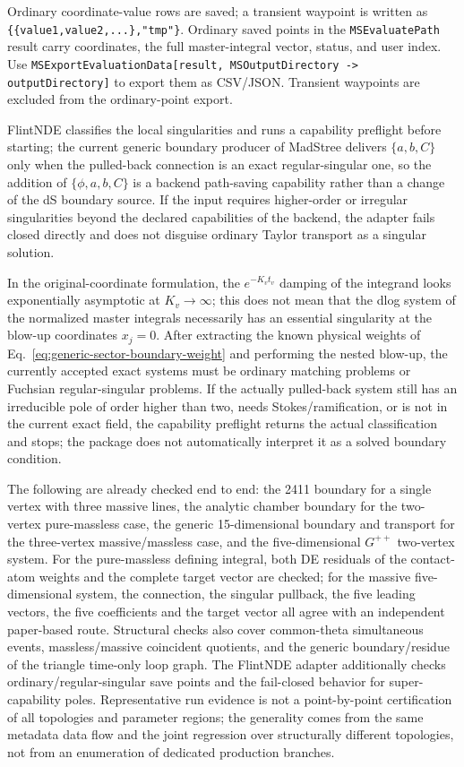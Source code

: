 \documentclass[11pt,a4paper]{article}
\begin{document}
Ordinary coordinate-value rows are saved; a transient waypoint is written as
\texttt{\{\{value1,value2,...\},"tmp"\}}. Ordinary saved points in the \texttt{MSEvaluatePath} result
carry coordinates, the full master-integral vector, status, and user index. Use
\texttt{MSExportEvaluationData[result, MSOutputDirectory -> outputDirectory]} to export
them as CSV/JSON. Transient waypoints are excluded from the ordinary-point export.

FlintNDE classifies the local singularities and runs a capability preflight before starting; the current generic boundary producer of MadStree delivers $\{a,b,C\}$ only when the pulled-back connection is an exact regular-singular one, so the addition of $\{\phi,a,b,C\}$ is a backend path-saving capability rather than a change of the dS boundary source. If the input requires higher-order or irregular singularities beyond the declared capabilities of the backend, the adapter fails closed directly and does not disguise ordinary Taylor transport as a singular solution.

In the original-coordinate formulation, the $e^{-K_vt_v}$ damping of the integrand looks exponentially asymptotic at $K_v\to\infty$; this does not mean that the dlog system of the normalized master integrals necessarily has an essential singularity at the blow-up coordinates $x_j=0$. After extracting the known physical weights of Eq.~\eqref{eq:generic-sector-boundary-weight} and performing the nested blow-up, the currently accepted exact systems must be ordinary matching problems or Fuchsian regular-singular problems. If the actually pulled-back system still has an irreducible pole of order higher than two, needs Stokes/ramification, or is not in the current exact field, the capability preflight returns the actual classification and stops; the package does not automatically interpret it as a solved boundary condition.

The following are already checked end to end: the 2411 boundary for a single vertex with three massive lines, the analytic chamber boundary for the two-vertex pure-massless case, the generic 15-dimensional boundary and transport for the three-vertex massive/massless case, and the five-dimensional $G^{++}$ two-vertex system. For the pure-massless defining integral, both DE residuals of the contact-atom weights and the complete target vector are checked; for the massive five-dimensional system, the connection, the singular pullback, the five leading vectors, the five coefficients and the target vector all agree with an independent paper-based route. Structural checks also cover common-theta simultaneous events, massless/massive coincident quotients, and the generic boundary/residue of the triangle time-only loop graph. The FlintNDE adapter additionally checks ordinary/regular-singular save points and the fail-closed behavior for super-capability poles. Representative run evidence is not a point-by-point certification of all topologies and parameter regions; the generality comes from the same metadata data flow and the joint regression over structurally different topologies, not from an enumeration of dedicated production branches.
\end{document}
